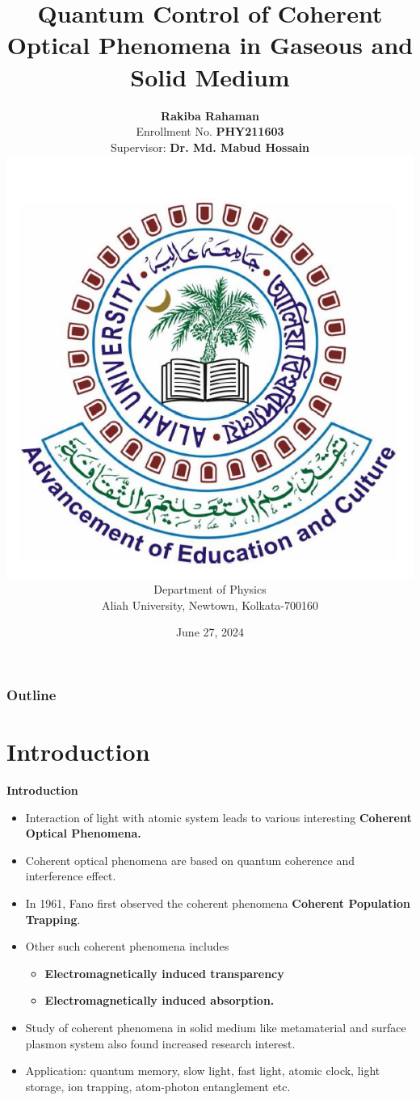 \documentclass[9pt,aspectratio94]{beamer}
\title [Literature Review]{Quantum Control of Coherent Optical Phenomena in Gaseous and Solid Medium }
\subtitle{\large\text{[ Literarure review presentation ]   }}
\date{June 27, 2024}
\author[\textbf{Rakiba Rahaman}]
{\textbf{Rakiba Rahaman}\\
\vspace{1mm}
\small Enrollment No. \textbf{PHY211603}\\
\vspace{1mm}
Supervisor: \textbf{Dr. Md. Mabud Hossain} \\
\vspace{1mm}
\includegraphics[scale=.13]{logo.png}\\
\vspace{1.5mm}
Department of Physics\\
\vspace{1.5mm}
Aliah University, Newtown, Kolkata-700160
}
\begin{document}
\begin{frame}
 \titlepage   
\end{frame}
\begin{frame}\frametitle{Outline}
  \tableofcontents[hideallsubsections]

\end{frame}


\section{\textbf{Introduction}}
\begin{frame}{\textbf{Introduction}}
   \begin{itemize}
       \item Interaction of light with atomic system leads to various interesting \textbf{ Coherent Optical Phenomena.}
       \item Coherent optical phenomena are based on quantum coherence and interference effect.
       \item In 1961, Fano first observed the coherent phenomena \textbf{Coherent Population Trapping}.
       \item Other such coherent phenomena includes 
       \begin{itemize}
           \item \textbf{Electromagnetically induced transparency} 
           \item \textbf{Electromagnetically induced absorption.}
       \end{itemize}
       \item Study of coherent phenomena in solid medium like metamaterial and surface plasmon system also found increased research interest.
       \item Application: quantum memory, slow light, fast light, atomic clock, light storage, ion trapping, atom-photon entanglement etc.
   \end{itemize}
\end{frame}


\end{document}
